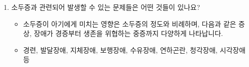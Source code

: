 \begin{enumerate}[1.]
\begin{itemize}[→]
	\end{itemize}
\item 소두증과 관련되어 발생할 수 있는 문제들은 어떤 것들이 있나요?
	\begin{itemize}[→]\tightlist
	\item 소두증이 아기에게 미치는 영향은 소두증의 정도와 비례하며, 다음과 같은 증상, 장애가 경증부터 생존을 위협하는 중증까지 다양하게 나타납니다.
    \item 경련, 발달장애, 지체장애, 보행장애, 수유장애, 연하곤란, 청각장애, 시각장애 등
	\end{itemize}	
\end{enumerate}